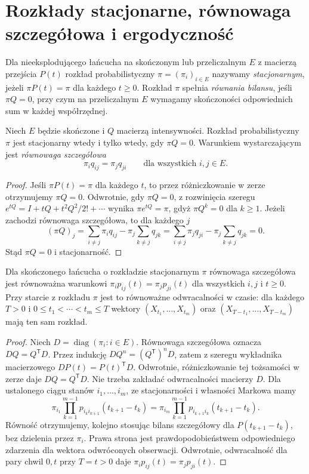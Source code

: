 \section{Rozkłady stacjonarne, równowaga szczegółowa i ergodyczność}
\begin{definicja}
Dla nieeksplodującego łańcucha na skończonym lub
przeliczalnym $E$ z macierzą przejścia $P(t)$ rozkład probabilistyczny $\pi=(\pi_i)_{i\in E}$
nazywamy \emph{stacjonarnym}, jeżeli
$\pi P(t)=\pi$ dla każdego $t\ge0$.
Rozkład $\pi$ spełnia \emph{równania bilansu}, jeśli
$\pi Q=0$, przy czym na przeliczalnym $E$ wymagamy
skończoności odpowiednich sum w każdej współrzędnej.
\end{definicja}

\begin{twierdzenie}
Niech $E$ będzie skończone i $Q$ macierzą intensywności.
Rozkład probabilistyczny $\pi$ jest stacjonarny wtedy i tylko
wtedy, gdy $\pi Q=0$. Warunkiem wystarczającym jest
\emph{równowaga szczegółowa}
\[
\pi_iq_{ij}=\pi_jq_{ji}\qquad\text{dla wszystkich }i,j\in E.
\]
\end{twierdzenie}
\begin{proof}
Jeśli $\pi P(t)=\pi$ dla każdego $t$, to przez różniczkowanie
w zerze otrzymujemy $\pi Q=0$.
Odwrotnie, gdy $\pi Q=0$, z rozwinięcia szeregu
$e^{tQ}=I+tQ+t^2Q^2/2!+\cdots$ wynika
$\pi e^{tQ}=\pi$, gdyż $\pi Q^k=0$ dla $k\ge1$.
Jeżeli zachodzi równowaga szczegółowa, to dla każdego $j$
\[
(\pi Q)_j=\sum_{i\ne j}\pi_iq_{ij}-\pi_j\sum_{k\ne j}q_{jk}
=\sum_{i\ne j}\pi_jq_{ji}-\pi_j\sum_{k\ne j}q_{jk}=0.
\]
Stąd $\pi Q=0$ i stacjonarność.
\end{proof}

\begin{stwierdzenie}
Dla skończonego łańcucha o rozkładzie stacjonarnym
$\pi$ równowaga szczegółowa jest równoważna warunkowi
$\pi_i p_{ij}(t)=\pi_j p_{ji}(t)$ dla wszystkich $i,j$
i $t\ge0$. Przy starcie z rozkładu $\pi$ jest to
równoważne odwracalności w czasie: dla każdego $T>0$ i
$0\le t_1<\cdots<t_m\le T$ wektory
$(X_{t_1},\ldots,X_{t_m})$ oraz
$(X_{T-t_1},\ldots,X_{T-t_m})$ mają ten sam rozkład.
\end{stwierdzenie}
\begin{proof}
Niech $D=\operatorname{diag}(\pi_i:i\in E)$.
Równowaga szczegółowa oznacza $DQ=Q^{\mathsf T}D$.
Przez indukcję $DQ^n=(Q^{\mathsf T})^nD$, zatem
z szeregu wykładnika macierzowego
$DP(t)=P(t)^{\mathsf T}D$. Odwrotnie, różniczkowanie
tej tożsamości w zerze daje $DQ=Q^{\mathsf T}D$.
Nie trzeba zakładać odwracalności macierzy $D$.
Dla ustalonego ciągu stanów $i_1,\ldots,i_m$,
ze stacjonarności i własności Markowa mamy
\[
\pi_{i_1}\prod_{k=1}^{m-1}p_{i_k i_{k+1}}(t_{k+1}-t_k)
=\pi_{i_m}\prod_{k=1}^{m-1}p_{i_{k+1} i_k}(t_{k+1}-t_k).
\]
Równość otrzymujemy, kolejno stosując bilans szczegółowy
dla $P(t_{k+1}-t_k)$, bez dzielenia przez $\pi_i$.
Prawa strona jest prawdopodobieństwem odpowiedniego
zdarzenia dla wektora odwróconych obserwacji.
Odwrotnie, odwracalność dla pary chwil $0,t$ przy
$T=t>0$ daje $\pi_i p_{ij}(t)=\pi_j p_{ji}(t)$.
\end{proof}

